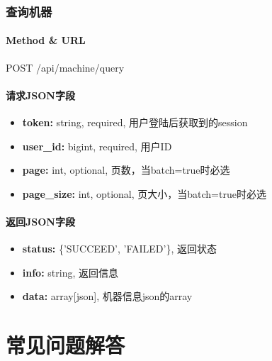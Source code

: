 ﻿\documentclass[a4paper]{report}
\begin{document}
\subsection{查询机器} %
\subsubsection{Method \& URL} %
POST /api/machine/query 

\subsubsection{请求JSON字段}
\begin{itemize}
	\item \textbf{token:} string, required, 用户登陆后获取到的session
	\item \textbf{user\_id:} bigint, required, 用户ID
	\item \textbf{page:} int, optional, 页数，当batch=true时必选
	\item \textbf{page\_size:} int, optional, 页大小，当batch=true时必选
\end{itemize}

\subsubsection{返回JSON字段}
\begin{itemize}
	\item \textbf{status:} \{'SUCCEED', 'FAILED'\}, 返回状态
	\item \textbf{info:} string, 返回信息
	\item \textbf{data:} array[json], 机器信息json的array
\end{itemize}







\chapter{常见问题解答} %
\label{sec:常见问题解答}
\end{document}
